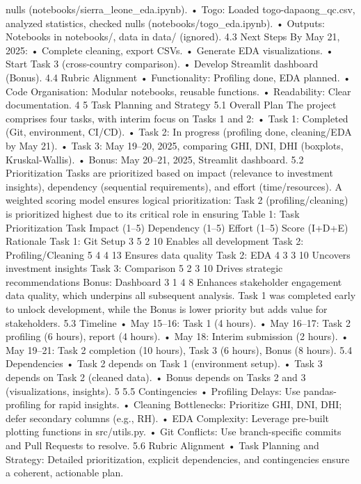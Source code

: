 nulls (notebooks/sierra_leone_eda.ipynb).
• Togo: Loaded togo-dapaong_qc.csv, analyzed statistics, checked nulls (notebooks/togo_eda.ipynb).
• Outputs: Notebooks in notebooks/, data in data/ (ignored).
4.3 Next Steps
By May 21, 2025:
• Complete cleaning, export CSVs.
• Generate EDA visualizations.
• Start Task 3 (cross-country comparison).
• Develop Streamlit dashboard (Bonus).
4.4 Rubric Alignment
• Functionality: Profiling done, EDA planned.
• Code Organisation: Modular notebooks, reusable functions.
• Readability: Clear documentation.
4
5 Task Planning and Strategy
5.1 Overall Plan
The project comprises four tasks, with interim focus on Tasks 1 and 2:
• Task 1: Completed (Git, environment, CI/CD).
• Task 2: In progress (profiling done, cleaning/EDA by May 21).
• Task 3: May 19–20, 2025, comparing GHI, DNI, DHI (boxplots, Kruskal-Wallis).
• Bonus: May 20–21, 2025, Streamlit dashboard.
5.2 Prioritization
Tasks are prioritized based on impact (relevance to investment insights), dependency (sequential requirements), and effort (time/resources). A weighted scoring model ensures logical prioritization: Task 2 (profiling/cleaning) is prioritized highest due to its critical role in ensuring
Table 1: Task Prioritization
Task Impact
(1–5)
Dependency
(1–5)
Effort (1–5) Score
(I+D+E)
Rationale
Task 1: Git Setup 3 5 2 10 Enables all development
Task 2: Profiling/Cleaning 5 4 4 13 Ensures data
quality
Task 2: EDA 4 3 3 10 Uncovers investment insights
Task 3: Comparison 5 2 3 10 Drives strategic
recommendations
Bonus: Dashboard 3 1 4 8 Enhances stakeholder engagement
data quality, which underpins all subsequent analysis. Task 1 was completed early to unlock
development, while the Bonus is lower priority but adds value for stakeholders.
5.3 Timeline
• May 15–16: Task 1 (4 hours).
• May 16–17: Task 2 profiling (6 hours), report (4 hours).
• May 18: Interim submission (2 hours).
• May 19–21: Task 2 completion (10 hours), Task 3 (6 hours), Bonus (8 hours).
5.4 Dependencies
• Task 2 depends on Task 1 (environment setup).
• Task 3 depends on Task 2 (cleaned data).
• Bonus depends on Tasks 2 and 3 (visualizations, insights).
5
5.5 Contingencies
• Profiling Delays: Use pandas-profiling for rapid insights.
• Cleaning Bottlenecks: Prioritize GHI, DNI, DHI; defer secondary columns (e.g., RH).
• EDA Complexity: Leverage pre-built plotting functions in src/utils.py.
• Git Conflicts: Use branch-specific commits and Pull Requests to resolve.
5.6 Rubric Alignment
• Task Planning and Strategy: Detailed prioritization, explicit dependencies, and contingencies ensure a coherent, actionable plan.
